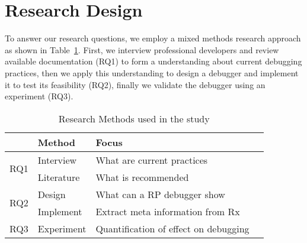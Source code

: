 \section{Research Design}
To answer our research questions, we employ a mixed methods research approach as shown in Table~\ref{research-methods}.
First, we interview professional developers and review available documentation (RQ1) to form a understanding about current debugging practices,
then we apply this understanding to design a debugger and implement it to test its feasibility (RQ2),
finally we validate the debugger using an experiment (RQ3).

\begin{table}[t]
\centering
\begin{tabularx}{\columnwidth}{lllX}
\hline
\textbf{}            & \textbf{Method} & \textbf{Focus}                               \\ \hline
\multirow{2}{*}{RQ1} & Interview       & What are current practices                   \\ 
                     & Literature      & What is recommended                          \\
\multirow{2}{*}{RQ2} & Design          & What can a RP debugger show                  \\ 
                     & Implement       & Extract meta information from Rx             \\ 
RQ3                  & Experiment      & Quantification of effect on debugging        \\ \hline
\end{tabularx}
\caption{Research Methods used in the study}
\label{research-methods}
\end{table}

\iffalse
\todo{
qualitive data
quantitive
design, implemented, tested with real developers
buzz words: mixed methods, grounded theory
}
\fi
